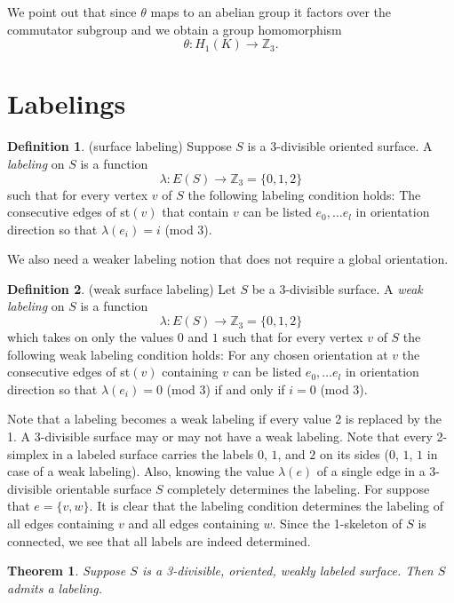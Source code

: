 \documentclass[12pt]{article}
\newtheorem{theorem}{Theorem}
\theoremstyle{definition}
\newtheorem{definition}{Definition}
\begin{document}
We point out that since $\theta$ maps to an abelian group it factors over the commutator subgroup and we obtain a group homomorphism
$$\theta\colon H_1(K)\to \mathbb Z_3.$$

\section{Labelings}

\begin{definition}\label{j_labelable_def}(surface labeling) 
    Suppose $S$ is a 3-divisible oriented surface. A \textit{labeling} on $S$ is a function 
    $$\lambda\colon E(S)\to \mathbb Z_3=\{0, 1, 2 \}$$
    such that for every vertex $v$ of $S$ the following labeling condition holds: The consecutive edges of st$(v)$ that contain $v$ can be listed $e_0,\ldots e_l$ in orientation direction so that  $\lambda(e_i)=i$ (mod 3). 
\end{definition}

We also need a weaker labeling notion that does not require a global orientation.

\begin{definition}\label{weaklabel_def}(weak surface labeling) 
    Let $S$ be a 3-divisible surface. A \textit{weak labeling} on $S$ is a function 
    $$\lambda\colon E(S)\to \mathbb Z_3=\{0, 1, 2 \}$$ which takes on only the values $0$ and $1$
    such that for every vertex $v$ of $S$ the following weak labeling condition holds: For any chosen orientation at $v$ the consecutive edges of st$(v)$ containing $v$ can be listed $e_0,\ldots e_l$ in orientation direction so that  $\lambda(e_i)=0$ (mod 3) if and only if $i=0$ (mod 3).
\end{definition}

Note that a labeling becomes a weak labeling if every value 2 is replaced by the 1.
A 3-divisible surface may or may not have a weak labeling. Note that every 2-simplex in a labeled surface carries the labels $0$, $1$, and $2$ on its sides ($0$, $1$, $1$ in case of a weak labeling).
Also, knowing the value $\lambda(e)$ of a single edge in a 3-divisible orientable surface $S$ completely determines the labeling. For suppose that $e=\{v,w\}$. It is clear that the labeling condition determines the labeling of all edges containing $v$ and all edges containing $w$. Since the 1-skeleton of $S$ is connected, we see that all labels are indeed determined.

\begin{theorem}\label{j_strong_theorem}
    Suppose $S$ is a 3-divisible, oriented, weakly labeled surface. Then $S$ admits a labeling.
\end{theorem}
\end{document}
